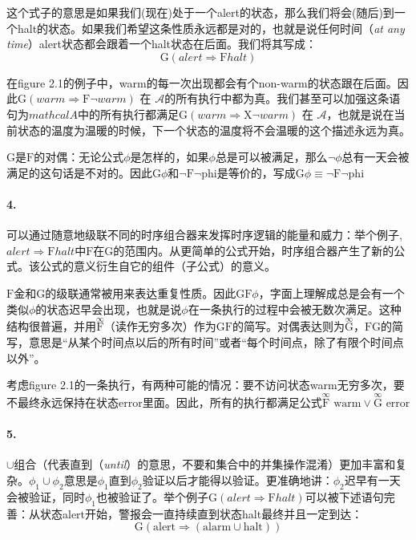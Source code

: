 \documentclass{book}
\begin{document}
    这个式子的意思是如果我们(现在)处于一个alert的状态，那么我们将会(随后)到一个halt的状态。如果我们希望这条性质永远都是对的，也就是说任何时间（{\itshape at any time}）alert状态都会跟着一个halt状态在后面。我们将其写成：
    \begin{equation*}
      \mathrm{G}(alert \Rightarrow \mathrm{F}halt)
    \end{equation*}

    在figure 2.1的例子中，warm的每一次出现都会有个non-warm的状态跟在后面。因此$\mathrm{G}(warm \Rightarrow \mathrm{F} \neg warm)$ 在 $\mathcal{A}$的所有执行中都为真。我们甚至可以加强这条语句为$mathcal{A}$中的所有执行都满足$\mathrm{G}(warm \Rightarrow \mathrm{X} \neg warm)$ 在 $\mathcal{A}$，也就是说在当前状态的温度为温暖的时候，下一个状态的温度将不会温暖的这个描述永远为真。

    $\mathrm{G}$是$\mathrm{F}$的对偶：无论公式$\phi$是怎样的，如果$\phi$总是可以被满足，那么$\neg\phi$总有一天会被满足的这句话是不对的。因此$\mathrm{G}\phi$和$\neg \mathrm{F}\neg\mathrm{phi}$是等价的，写成$\mathrm{G}\phi \equiv \neg \mathrm{F}\neg\mathrm{phi}$

    \paragraph{4.} 可以通过随意地级联不同的时序组合器来发挥时序逻辑的能量和威力：举个例子,$alert \Rightarrow \mathrm{F} halt$中$\mathrm{F}$在$\mathrm{G}$的范围内。从更简单的公式开始，时序组合器产生了新的公式。该公式的意义衍生自它的组件（子公式）的意义。

    $\mathrm{F}$金和$\mathrm{G}$的级联通常被用来表达重复性质。因此$\mathrm{G}\mathrm{F}\phi$，字面上理解成总是会有一个类似$\phi$的状态迟早会出现，也就是说$\phi$在一条执行的过程中会被无数次满足。这种结构很普遍，并用$\overset{\infty}{\mathrm{F}}$（读作无穷多次）作为$\mathrm{G}\mathrm{F}$的简写。对偶表达则为$\overset{\infty}{\mathrm{G}}$，$\mathrm{F}\mathrm{G}$的简写，意思是“从某个时间点以后的所有时间”或者“每个时间点，除了有限个时间点以外”。

    考虑figure 2.1的一条执行，有两种可能的情况：要不访问状态warm无穷多次，要不最终永远保持在状态error里面。因此，所有的执行都满足公式$\overset{\infty}{\mathrm{F}}\text{ warm} \vee \overset{\infty}{\mathrm{G}} \text{ error}$

    \paragraph{5.} $\cup$组合（代表直到（{\itshape until}）的意思，不要和集合中的并集操作混淆）更加丰富和复杂。$\phi_1 \cup \phi_2$意思是$\phi_1$直到$\phi_2$验证以后才能得以验证。更准确地讲：$\phi_2$迟早有一天会被验证，同时$\phi_1$也被验证了。举个例子$\mathrm{G}(alert \Rightarrow \mathrm{F} halt)$可以被下述语句完善：从状态alert开始，警报会一直持续直到状态halt最终并且一定到达：
    \begin{equation*}
      \mathrm{G}(\text{alert} \Rightarrow ( \text{alarm}\cup \text{halt}) )
    \end{equation*}
\end{document}
